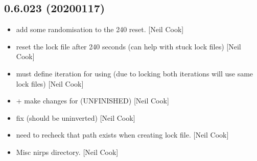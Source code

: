 \documentclass[a4paper,10pt,english]{report}
\begin{document}
\subsection{0.6.023 (2020\sphinxhyphen{}01\sphinxhyphen{}17)}
\label{\detokenize{misc/changelog:id15}}\begin{itemize}
\item {} 
 \sphinxhyphen{} add some randomisation to the 240 reset. {[}Neil Cook{]}

\item {} 
 \sphinxhyphen{} reset the lock file after 240 seconds (can help with
stuck lock files) {[}Neil Cook{]}

\item {} 
 \sphinxhyphen{} must define iteration for using
 (due to locking \textendash{} both iterations will use same lock
files) {[}Neil Cook{]}

\item {} 
 +  \sphinxhyphen{}
make changes for  (UNFINISHED) {[}Neil Cook{]}

\item {} 
 \sphinxhyphen{} fix  (should be un\sphinxhyphen{}inverted) {[}Neil
Cook{]}

\item {} 
 \sphinxhyphen{} need to re\sphinxhyphen{}check that path exists when creating lock
file. {[}Neil Cook{]}

\item {} 
Misc nirps directory. {[}Neil Cook{]}

\end{itemize}
\end{document}

